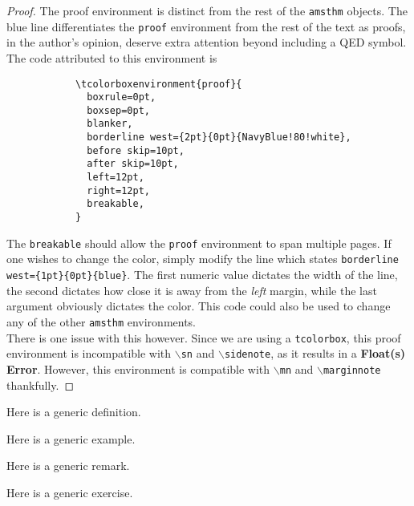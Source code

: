 \documentclass[10pt]{article}
\begin{document}
	\begin{proof}
		The proof environment is distinct from the rest of the \texttt{amsthm} objects. The blue line differentiates the \texttt{proof} environment from the rest of the text as proofs, in the author's opinion, deserve extra attention beyond including a QED symbol. The code attributed to this environment is
		\begin{verbatim}
			\tcolorboxenvironment{proof}{
			  boxrule=0pt,
			  boxsep=0pt,
			  blanker,
			  borderline west={2pt}{0pt}{NavyBlue!80!white},
			  before skip=10pt,
			  after skip=10pt,
			  left=12pt,
			  right=12pt,
			  breakable,
			}
		\end{verbatim}
		The \texttt{breakable} should allow the \texttt{proof} environment to span multiple pages. If one wishes to change the color, simply modify the line which states \texttt{borderline west=\{1pt\}\{0pt\}\{blue\}}. The first numeric value dictates the width of the line, the second dictates how close it is away from the \textit{left} margin, while the last argument obviously dictates the color. This code could also be used to change any of the other \texttt{amsthm} environments.\\

		There is one issue with this however. Since we are using a \texttt{tcolorbox}, this proof environment is incompatible with \texttt{$\backslash$sn} and \texttt{$\backslash$sidenote}, as it results in a \textbf{Float(s) Error}. However, this environment is compatible with \texttt{$\backslash$mn} and \texttt{$\backslash$marginnote} thankfully.
	\end{proof}
	\begin{definition}
		Here is a generic definition.
	\end{definition}
	\begin{example}
		Here is a generic example.
	\end{example}	
	\begin{remark}
		Here is a generic remark.
	\end{remark}
	\begin{exercise}
		Here is a generic exercise.
	\end{exercise}
	
\end{document}
